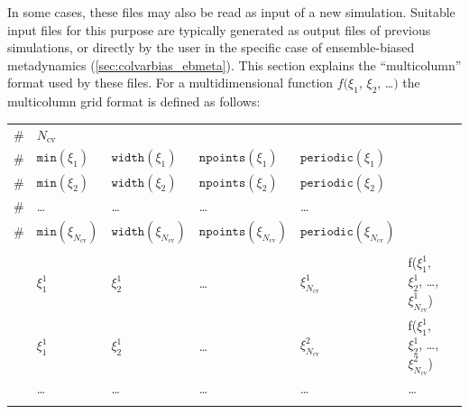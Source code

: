 In some cases, these files may also be read as input of a new simulation.
Suitable input files for this purpose are typically generated as output files of previous simulations, or directly by the user in the specific case of ensemble-biased metadynamics (\ref{sec:colvarbias_ebmeta}).
This section explains the ``multicolumn'' format used by these files.
For a multidimensional function $f(\xi_{1}$, $\xi_{2}$, \ldots $)$ the multicolumn grid format is defined as follows:\\

\begin{tabular}{l l l l l l l}
\# & $N_{\mathrm{cv}}$ & & & & \\
\# & $\mathtt{min}(\xi_{1})$ & $\mathtt{width}(\xi_{1})$ & $\mathtt{npoints}({\xi_{1}})$ & $\mathtt{periodic}({\xi_{1}})$ \\
\# & $\mathtt{min}(\xi_{2})$ & $\mathtt{width}(\xi_{2})$ & $\mathtt{npoints}({\xi_{2}})$ & $\mathtt{periodic}({\xi_{2}})$ \\
\# & \ldots & \ldots & \ldots & \ldots \\
\# & $\mathtt{min}(\xi_{N_{\mathrm{cv}}})$ & $\mathtt{width}(\xi_{N_{\mathrm{cv}}})$ & $\mathtt{npoints}({\xi_{N_{\mathrm{cv}}}})$ & $\mathtt{periodic}({\xi_{N_{\mathrm{cv}}}})$ & \\
\\
& $\xi^{1}_{1}$ & $\xi^{1}_{2}$ & \ldots & $\xi^{1}_{N_{\mathrm{cv}}}$ & f($\xi^{1}_{1}$, $\xi^{1}_{2}$, \ldots, $\xi^{1}_{N_{\mathrm{cv}}}$) & \\
& $\xi^{1}_{1}$ & $\xi^{1}_{2}$ & \ldots & $\xi^{2}_{N_{\mathrm{cv}}}$ & f($\xi^{1}_{1}$, $\xi^{1}_{2}$, \ldots, $\xi^{2}_{N_{\mathrm{cv}}}$) \\
& \ldots & \ldots & \ldots & \ldots & \ldots \\
\\
\end{tabular}


